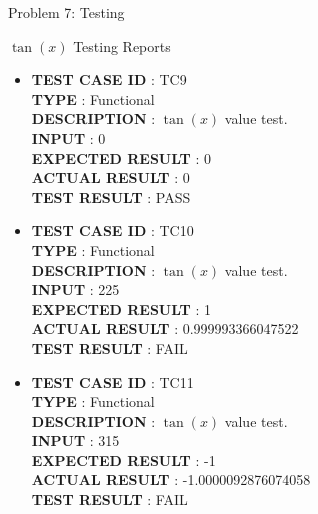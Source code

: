 \documentclass[a4paper,12pt]{article}
\begin{document}
\begin{section}{Problem 7: Testing}
\begin{subsubsection}{$\tan(x)$ Testing Reports}
\begin{itemize}
\item \textbf{TEST CASE ID} \hspace{1.25cm} : TC9  \\
\textbf{TYPE } \hspace{3.15cm}  : Functional\\
\textbf{DESCRIPTION }\hspace{1.25cm} : $\tan(x)$ value test. \\
\textbf{INPUT} \hspace{3.05cm} :  0 \\
\textbf{EXPECTED RESULT} \hspace{0.01cm} : 0 \\
\textbf{ACTUAL RESULT} \hspace{0.6cm} : 0 \\
\textbf{TEST RESULT} \hspace{1.40cm} : PASS \\	

\item \textbf{TEST CASE ID} \hspace{1.25cm} : TC10 \\
\textbf{TYPE } \hspace{3.15cm}  : Functional\\
\textbf{DESCRIPTION }\hspace{1.25cm} : $\tan(x)$ value test. \\
\textbf{INPUT} \hspace{3.05cm} :  225 \\
\textbf{EXPECTED RESULT} \hspace{0.01cm} : 1 \\
\textbf{ACTUAL RESULT} \hspace{0.6cm} : 0.999993366047522 \\
\textbf{TEST RESULT} \hspace{1.40cm} : FAIL \\


\item \textbf{TEST CASE ID} \hspace{1.25cm} : TC11  \\
\textbf{TYPE } \hspace{3.15cm}  : Functional\\
\textbf{DESCRIPTION }\hspace{1.25cm} : $\tan(x)$ value test. \\
\textbf{INPUT} \hspace{3.05cm} :  315 \\
\textbf{EXPECTED RESULT} \hspace{0.01cm} : -1 \\
\textbf{ACTUAL RESULT} \hspace{0.6cm} : -1.0000092876074058 \\
\textbf{TEST RESULT} \hspace{1.40cm} : FAIL \\


\end{itemize}
\end{subsubsection}
\end{section}
\end{document}
